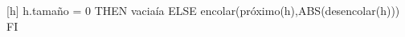 \begin{Representacion}



  [h]{
    \IF h.tama\~{n}o = 0 THEN vacia\'{i}a ELSE encolar(pr\'{o}ximo(h),ABS(desencolar(h))) FI
  }

\end{Representacion}

